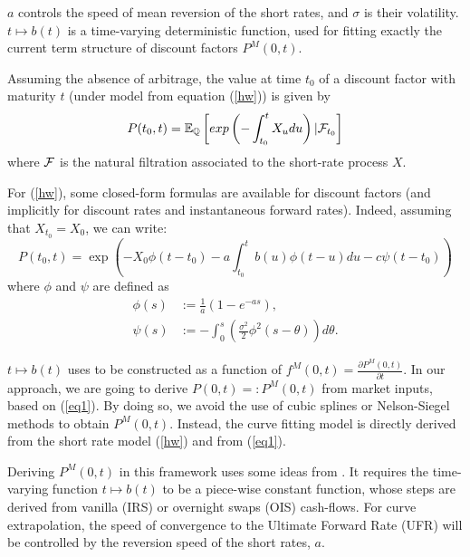\medskip

$a$ controls the speed of mean reversion of the short rates, and $\sigma$ is their volatility. $t \mapsto b(t)$ is a time-varying deterministic function, used for fitting exactly the current term structure of discount factors $P^M(0, t)$.

\medskip

Assuming the absence of arbitrage, the value at time $t_0$ of a discount factor with maturity $t$ (under model from equation (\ref{hw})) is given by
\begin{equation}
\label{ZC_price}
P(t_0, t) = \mathbb{E}_{\mathbb{Q}}\left[ exp\left(-\int_{t_0}^t X_u du\right) | \mathcal{F}_{t_0}\right]
\end{equation}
where $\mathcal{F}$ is the natural filtration associated to the short-rate process $X$. %

\medskip


For (\ref{hw}), some closed-form formulas are available for discount factors (and implicitly for discount rates and instantaneous forward rates). Indeed, assuming that $X_{t_0} = X_0$, we can write:
\begin{equation}
\label{eq1}
P(t_0,t) =\exp\left(-X_0\phi(t-t_0)- a\int_{t_0}^{t}{b(u)\phi(t-u)du} -c\psi(t-t_0)
\right)
\end{equation}
where $\phi$ and $\psi$ are defined as
\begin{align}
\label{eq:phi}
\phi(s)&:=\frac{1}{a}\left(1-e^{-as}\right), \\
\label{eq:psi}
\psi(s)&:=-\int_{0}^{s}{ \left( \frac{\sigma^2}{2} \phi^2(s-\theta)\right)d\theta}.
\end{align}

\medskip

$t \mapsto b(t)$ uses to be constructed as a function of $f^M(0,t) =\frac{\partial P^M(0,t)}{\partial t}$. In our approach, we are going to derive $P(0,t)=:P^M(0,t)$ from market inputs, based on  (\ref{eq1}). By doing so, we avoid the use of cubic splines or Nelson-Siegel methods to obtain $P^M(0,t)$. Instead, the curve fitting model is directly derived from the short rate model  (\ref{hw}) and from (\ref{eq1}).  

\medskip

Deriving $P^M(0,t)$ in this framework uses some ideas from \cite{Schlogl2000}. It requires the time-varying function $t \mapsto b(t)$ to be a piece-wise constant function, whose steps are derived from vanilla (IRS) or overnight swaps (OIS) cash-flows. For curve extrapolation, the speed of convergence to the Ultimate Forward Rate (UFR) will be controlled by the reversion speed of the short rates, $a$.

